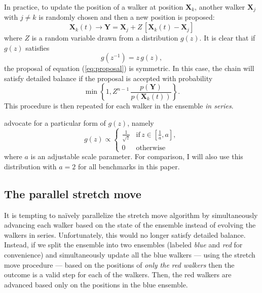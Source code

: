 \documentclass[12pt,preprint]{aastex}
\newcommand{\eq}[1]{equation (\ref{eq:#1})}
\newcommand{\eqlabel}[1]{\label{eq:#1}}
\begin{document}
In practice, to update the position of a walker at position $\mathbf{X}_k$,
another walker $\mathbf{X}_j$ with $j \ne k$ is randomly chosen and then
a new position is proposed:
\begin{equation}
    \eqlabel{proposal}
    \mathbf{X}_k (t) \rightarrow \mathbf{Y} = \mathbf{X}_j + Z \, [\mathbf{X}_k (t) - \mathbf{X}_j]
\end{equation}
where $Z$ is a random variable drawn from a distribution $g(z)$.  It is clear that
if $g(z)$ satisfies
\begin{equation}
    g(z^{-1}) = z \, g(z),
\end{equation}
the proposal of \eq{proposal} is symmetric. In this case, the chain will satisfy
detailed balance if the proposal is accepted with probability
\begin{equation}
    \min \left \{ 1, Z^{n-1} \, \frac{p(\mathbf{Y})}{p(\mathbf{X}_k(t))} \right \}.
\end{equation}
This procedure is then repeated for each walker in the ensemble \emph{in series}.

\citet{Goodman:2010} advocate for a particular form of $g(z)$, namely
\begin{equation}
    g(z) \propto \left \{ \begin{array}{ll}
        \displaystyle\frac{1}{\sqrt{z}} & \mathrm{if}\, z\in \left [ \displaystyle\frac{1}{a}, a \right ], \\
        0 & \mathrm{otherwise}
    \end{array} \right .
\end{equation}
where $a$ is an adjustable scale parameter. For comparison, I will also use this
distribution with $a=2$ for all benchmarks in this paper.

\subsection{The parallel stretch move}

It is tempting to na\"ively parallelize the stretch move algorithm by simultaneously
advancing each walker based on the state of the ensemble instead of evolving the
walkers in series. Unfortunately, this would no longer satisfy detailed balance.
Instead, if we split the ensemble into two ensembles (labeled \emph{blue} and
\emph{red} for convenience) and simultaneously update all the blue walkers ---
using the stretch move procedure --- based on the positions of \emph{only the red
walkers} then the outcome is a valid step for each of the walkers. Then,
the red walkers are advanced based only on the positions in the blue ensemble.
\end{document}
